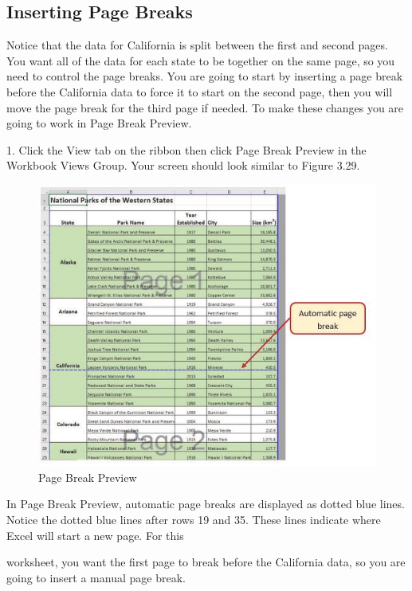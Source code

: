\subsection{Inserting Page Breaks}

Notice that the data for California is split between the first and second pages. You want all of the data
for each state to be together on the same page, so you need to control the page breaks. You are going
to start by inserting a page break before the California data to force it to start on the second page,
then you will move the page break for the third page if needed. To make these changes you are going
to work in Page Break Preview.

1. Click the View tab on the ribbon then click Page Break Preview in the Workbook Views Group.
Your screen should look similar to Figure 3.29.


\begin{figure}[H]
	\centering
	\includegraphics[width=\maxwidth{.95\linewidth}]{gfx/ch03_fig30}
	\caption{Page Break Preview}
	\label{03:fig30}
\end{figure}


In Page Break Preview, automatic page breaks are displayed as dotted blue lines. Notice the dotted
blue lines after rows 19 and 35. These lines indicate where Excel will start a new page. For this



worksheet, you want the first page to break before the California data, so you are going to insert a
manual page break.

